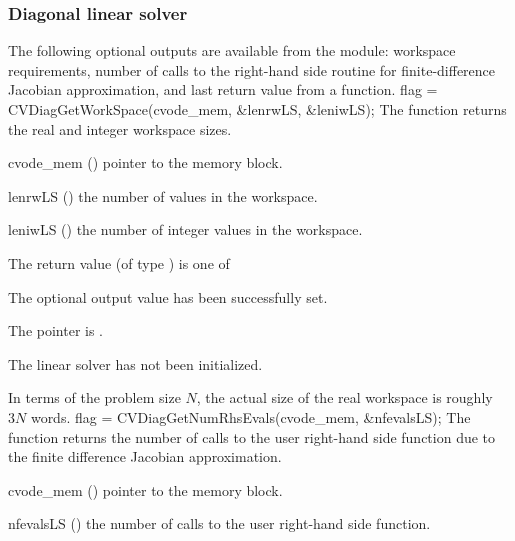 \subsubsection{Diagonal linear solver}\label{sss:optout_diag}
The following optional outputs are available from the {\cvdiag} module:
workspace requirements, number of calls to the right-hand side routine for 
finite-difference Jacobian approximation, and last return value from a 
{\cvdiag} function.
{
  flag = CVDiagGetWorkSpace(cvode\_mem, \&lenrwLS, \&leniwLS);
}
{
  The function  returns the
  {\cvdiag} real and integer workspace sizes.
}
{
  \begin{args}
  \item[cvode\_mem] ()
    pointer to the {\cvode} memory block.
  \item[lenrwLS] ()
    the number of  values in the {\cvdiag} workspace.
  \item[leniwLS] ()
    the number of integer values in the {\cvdiag} workspace.
  \end{args}
}
{
  The return value  (of type ) is one of
  \begin{args}
  \item[\Id{CVDIAG\_SUCCESS}] 
    The optional output value has been successfully set.
  \item[\Id{CVDIAG\_MEM\_NULL}]
    The  pointer is .
  \item[\Id{CVDIAG\_LMEM\_NULL}]
    The {\cvdiag} linear solver has not been initialized.
  \end{args}
}
{
  In terms of the problem size $N$, the actual size of the real workspace
  is roughly $3 N$  words.
}
{
  flag = CVDiagGetNumRhsEvals(cvode\_mem, \&nfevalsLS);
}
{
  The function  returns the
  number of calls to the user right-hand side function due to the 
  finite difference Jacobian approximation.
}
{
  \begin{args}
  \item[cvode\_mem] ()
    pointer to the {\cvode} memory block.
  \item[nfevalsLS] ()
    the number of calls to the user right-hand side function.
  \end{args}
}
